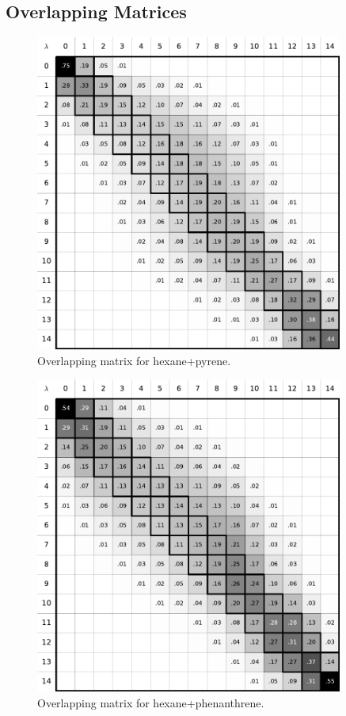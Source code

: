 \documentclass[
	12pt,				%
	openany,			%
	oneside,			%
	a4paper,			%
	english,			%
	brazil				%
	]{abntex2}
\begin{document}
\begin{apendicesenv}
\chapter{Overlapping Matrices}

\begin{figure}[H]
	\centering
	\includegraphics[width=0.9\textwidth]{Figures/ohex_pyr}
	\caption{Overlapping matrix for hexane+pyrene.}
\end{figure}

\begin{figure}[H]
	\centering
	\includegraphics[width=0.9\textwidth]{Figures/ohex_phen}
	\caption{Overlapping matrix for hexane+phenanthrene.}
\end{figure}


\end{apendicesenv}
\end{document}
